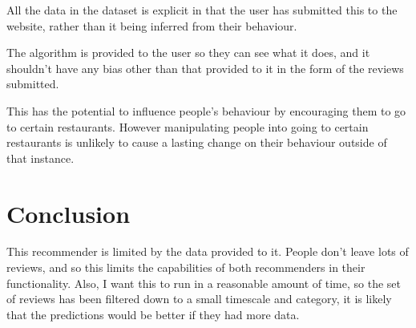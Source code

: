 \documentclass[conference]{IEEEtran}
\begin{document}
All the data in the dataset is explicit in that the user has submitted this to the website, rather than it being inferred from their behaviour.

The algorithm is provided to the user so they can see what it does, and it shouldn't have any bias other than that provided to it in the form of the reviews submitted.

This has the potential to influence people's behaviour by encouraging them to go to certain restaurants. However manipulating people into going to certain restaurants is unlikely to cause a lasting change on their behaviour outside of that instance.



\section{Conclusion}

This recommender is limited by the data provided to it. People don't leave lots of reviews, and so this limits the capabilities of both recommenders in their functionality. Also, I want this to run in a reasonable amount of time, so the set of reviews has been filtered down to a small timescale and category, it is likely that the predictions would be better if they had more data.




\end{document}
